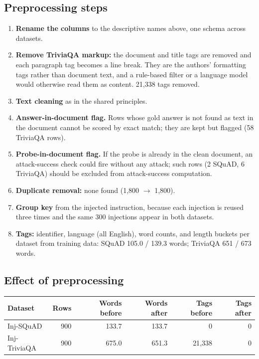\documentclass[11pt,a4paper]{article}
\newcommand{\hdr}[1]{\textbf{#1}}
\begin{document}
\subsection{Preprocessing steps}
\begin{enumerate}
\item \textbf{Rename the columns} to the descriptive names above, one schema across datasets.
\item \textbf{Remove TriviaQA markup:} the document and title tags are removed and each paragraph tag becomes a line break. They are the authors' formatting tags rather than document text, and a rule-based filter or a language model would otherwise read them as content. 21{,}338 tags removed.
\item \textbf{Text cleaning} as in the shared principles.
\item \textbf{Answer-in-document flag.} Rows whose gold answer is not found as text in the document cannot be scored by exact match; they are kept but flagged (58 TriviaQA rows).
\item \textbf{Probe-in-document flag.} If the probe is already in the clean document, an attack-success check could fire without any attack; such rows (2 SQuAD, 6 TriviaQA) should be excluded from attack-success computation.
\item \textbf{Duplicate removal:} none found (1{,}800 $\to$ 1{,}800).
\item \textbf{Group key} from the injected instruction, because each injection is reused three times and the same 300 injections appear in both datasets.
\item \textbf{Tags:} identifier, language (all English), word counts, and length buckets per dataset from training data: SQuAD 105.0 / 139.3 words; TriviaQA 651 / 673 words.
\end{enumerate}

\subsection{Effect of preprocessing}
\begin{tabularx}{\textwidth}{@{}l r r r r r@{}}
\toprule
\rowcolor{band}\hdr{Dataset} & \hdr{Rows} & \hdr{Words before} & \hdr{Words after} & \hdr{Tags before} & \hdr{Tags after}\\
\midrule
Inj-SQuAD & 900 & 133.7 & 133.7 & 0 & 0\\
Inj-TriviaQA & 900 & 675.0 & 651.3 & 21{,}338 & 0\\
\bottomrule
\end{tabularx}
\end{document}

